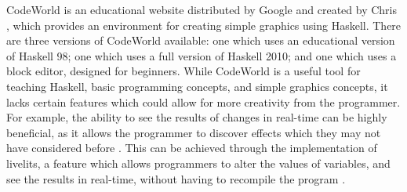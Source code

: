 \documentclass[../main.tex]{subfiles}
\begin{document}
            CodeWorld is an educational website distributed by Google and created by Chris
                \citet{codeWorldGitHub}, which provides an environment for creating simple
                graphics using Haskell.
            There are three versions of CodeWorld available: one which uses an educational
                version of Haskell 98; one which uses a full version of Haskell 2010; and one
                which uses a block editor, designed for beginners.
            While CodeWorld is a useful tool for teaching Haskell, basic programming
                concepts, and simple graphics concepts, it lacks certain features which could
                allow for more creativity from the programmer.
            For example, the ability to see the results of changes in real-time can be
                highly beneficial, as it allows the programmer to discover effects which they
                may not have considered before \citep{inventingOnPrinciple}.
            This can be achieved through the implementation of livelits, a feature which
                allows programmers to alter the values of variables, and see the results in
                real-time, without having to recompile the program \citep{livelits}.
\end{document}
